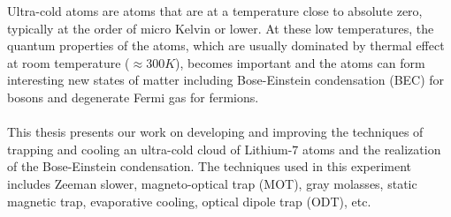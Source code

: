 %
%
%
Ultra-cold atoms are atoms that are at a temperature close to absolute zero, typically at the order of micro Kelvin or lower. At these low temperatures, the quantum properties of the atoms, which are usually dominated by thermal effect at room temperature ($\approx300K$), becomes important and the atoms can form interesting new states of matter including Bose-Einstein condensation (BEC) for bosons and degenerate Fermi gas for fermions.\\
\\
This thesis presents our work on developing and improving the techniques of trapping and cooling an ultra-cold cloud of Lithium-$7$ atoms and the realization of the Bose-Einstein condensation. The techniques used in this experiment includes Zeeman slower, magneto-optical trap (MOT), gray molasses, static magnetic trap, evaporative cooling, optical dipole trap (ODT), etc.
